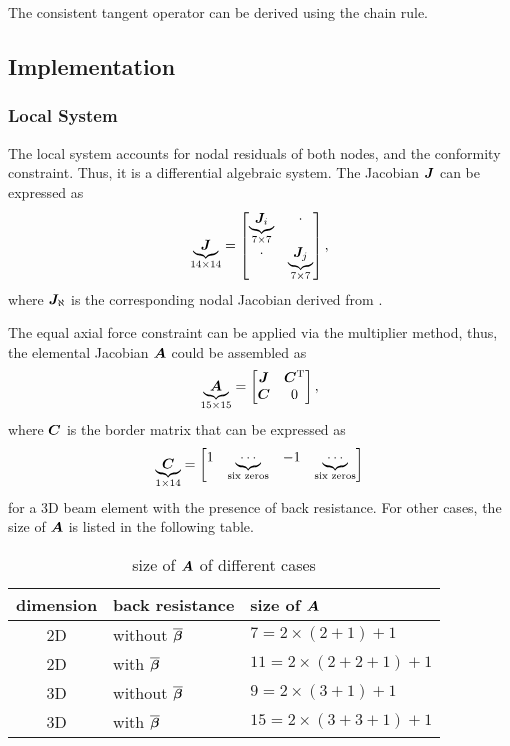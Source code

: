 The consistent tangent operator can be derived using the chain rule.
\subsection{Implementation}
\subsubsection{Local System}
The local system accounts for nodal residuals of both nodes, and the conformity constraint. Thus, it is a differential algebraic system. The Jacobian $\bm{J}$ can be expressed as
\begin{gather}
\underbrace{\bm{J}}_{14\times14}=\begin{bmatrix}
\underbrace{\bm{J}_i}_{7\times7}&\cdot\\
\cdot&\underbrace{\bm{J}_j}_{7\times7}
\end{bmatrix},
\end{gather}
where $\bm{J}_\aleph$ is the corresponding nodal Jacobian derived from .

The equal axial force constraint can be applied via the multiplier method, thus, the elemental Jacobian $\bm{A}$ could be assembled as
\begin{gather}
\underbrace{\bm{A}}_{15\times15}=
\begin{bmatrix}
\bm{J}&\bm{C}^{\mathrm{T}}\\
\bm{C}&0
\end{bmatrix},
\end{gather}
where $\bm{C}$ is the border matrix that can be expressed as
\begin{gather}
\underbrace{\bm{C}}_{1\times14}=\begin{bmatrix}1&\underbrace{\cdots}_{\text{six zeros}}&-1&\underbrace{\cdots}_{\text{six zeros}}\end{bmatrix}
\end{gather}
for a 3D beam element with the presence of back resistance. For other cases, the size of $\bm{A}$ is listed in the following table.
\begin{table}[H]
\centering
\caption{size of $\bm{A}$ of different cases}
\begin{tabular}{cll}
    \toprule
    dimension & back resistance             & size of $\bm{A}$                 \\ \midrule
       2D     & without $\overline{\bm{\beta}}$ & $7=2\times\left(2+1\right)+1$    \\
       2D     & with $\overline{\bm{\beta}}$    & $11=2\times\left(2+2+1\right)+1$ \\
       3D     & without $\overline{\bm{\beta}}$ & $9=2\times\left(3+1\right)+1$    \\
       3D     & with $\overline{\bm{\beta}}$    & $15=2\times\left(3+3+1\right)+1$ \\ \bottomrule\hline
\end{tabular}
\end{table}
